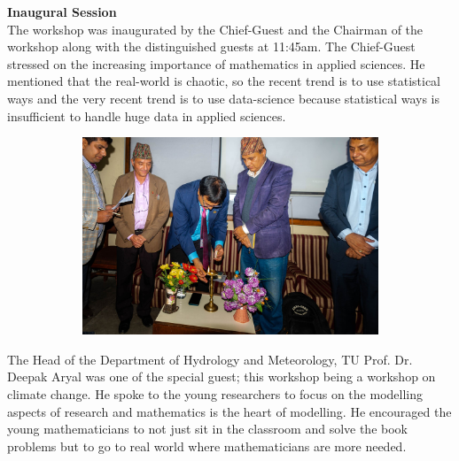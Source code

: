 \documentclass[a4paper,12pt]{report}
\begin{document}
\clearpage

{\bfseries \Large Inaugural Session}\\[3mm]
The workshop was inaugurated by the Chief-Guest and the Chairman of the workshop along with the distinguished guests at 11:45am. The Chief-Guest stressed on the increasing importance of mathematics in applied sciences. He mentioned that the real-world is chaotic, so the recent trend is to use statistical ways and the very recent trend is to use data-science because statistical ways is insufficient to handle huge data in applied sciences.

\vspace*{4mm}

\begin{figure}[h!]
  \centering
  \includegraphics[width=15cm, height=5.9cm]{inauguration.jpg}
\end{figure}

\vspace*{5mm}

\noindent
The Head of the Department of Hydrology and Meteorology, TU Prof. Dr. Deepak Aryal was one of the special guest; this workshop being a workshop on climate change. He spoke to the young researchers to focus on the modelling aspects of research and mathematics is the heart of modelling. He encouraged the young mathematicians to not just sit in the classroom and solve the book problems but to go to real world where mathematicians are more needed.
\end{document}
